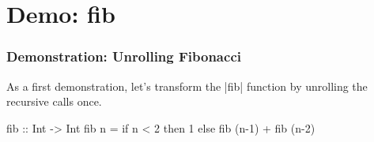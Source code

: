 \section{Demo: fib}

\begin{frame}
\frametitle{Demonstration: Unrolling Fibonacci}

As a first demonstration, let's transform the |fib| function by unrolling the recursive calls once.

{%
\small
\begin{code}
fib :: Int -> Int
fib n = if  n < 2
            then 1
            else fib (n-1) + fib (n-2)
\end{code}
}

\end{frame}
